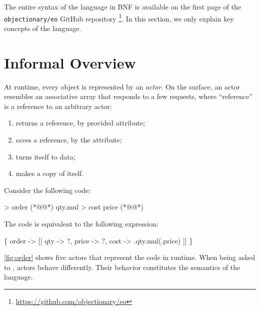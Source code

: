 


The entire syntax of the \eolang{} language in BNF is available on the first page of the \texttt{objectionary/eo} GitHub repository%
  \footnote{\url{https://github.com/objectionary/eo}}.
In this section, we only explain key concepts of the language.

\section{Informal Overview}

At runtime, every \eolang{} object is represented by an \emph{actor}.
On the surface, an actor resembles an associative array that responds to a few requests, where ``reference'' is a reference to an arbitrary actor:
\begin{enumerate}
  \item {} returns a reference, by provided attribute;
  \item {} saves a reference, by the attribute;
  \item {} turns itself to data;
  \item {} makes a copy of itself.
\end{enumerate}

Consider the following code:

\begin{ffcode}
 > order (*@\label{ln:order-start}@*)
  qty.mul > cost
    price (*@\label{ln:order-stop}@*)
\end{ffcode}

The code is equivalent to the following \phic{} expression:
\begin{phiquation*}
\Big\{ order -> [[ qty -> ?, price -> ?, cost -> \xi.qty.mul(\xi.price) ]] \Big\}
\end{phiquation*}

\cref{fig:order} shows five actors that represent the code in runtime.
When being asked to , actors behave differently.
Their behavior constitutes the semantics of the language.


